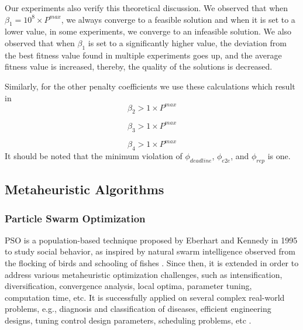 Our experiments also verify this theoretical discussion. We observed that when $\beta_1 = 10^8 \times P^{max}$, we always converge to a feasible solution and when it is set to a lower value, in some experiments, we converge to an infeasible solution. We also observed that when $\beta_1$ is set to a significantly higher value, the deviation from the best fitness value found in multiple experiments goes up, and the average fitness value is increased, thereby, the quality of the solutions is decreased.

Similarly, for the other penalty coefficients we use these calculations which result in
\begin{equation}
\label{}
  \beta_2 > 1 \times P^{max}  
\end{equation}

\begin{equation}
\label{}
    \beta_3 > 1 \times P^{max}
\end{equation}

\begin{equation}
\label{}
    \beta_4 > 1 \times P^{max}
\end{equation}
It should be noted that the minimum violation of $\phi_{deadline}$, $\phi_{e2e}$, and $\phi_{rep}$ is one.

\subsection{Metaheuristic Algorithms}
\subsubsection{Particle Swarm Optimization}
PSO is a population-based technique proposed by Eberhart and Kennedy in 1995 to study social behavior, as inspired by natural swarm intelligence observed from the flocking of birds and schooling of fishes \cite{Kennedy1995ParticleOptimization}. Since then, it is extended in order to address various metaheuristic optimization challenges, such as intensification, diversification, convergence analysis, local optima, parameter tuning, computation time, etc. It is successfully applied on several complex real-world problems, e.g., diagnosis and classification of diseases, efficient engineering designs, tuning control design parameters, scheduling problems, etc \cite{Poli2008AnApplications}. 


